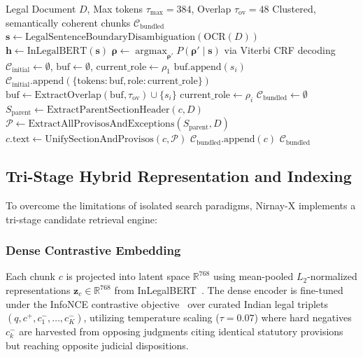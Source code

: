 \documentclass[conference]{IEEEtran}
\begin{document}
\begin{algorithm}[!t]
\caption{Proviso-Aware Rhetorical Chunking and Bundling}
\label{alg:chunking}
\begin{algorithmic}[1]
\Require Legal Document $D$, Max tokens $\tau_{\max}=384$, Overlap $\tau_{\text{ov}}=48$
\Ensure Clustered, semantically coherent chunks $\mathcal{C}_{\text{bundled}}$
\State $\mathbf{s} \gets \text{LegalSentenceBoundaryDisambiguation}(\text{OCR}(D))$
\State $\mathbf{h} \gets \text{InLegalBERT}(\mathbf{s})$
\State $\mathbf{\rho} \gets \operatorname{argmax}_{\mathbf{\rho}'} P(\mathbf{\rho}' \mid \mathbf{s})$ via Viterbi CRF decoding~\cite{lafferty2001crf}
\State $\mathcal{C}_{\text{initial}} \gets \emptyset$, $\text{buf} \gets \emptyset$, $\text{current\_role} \gets \rho_1$
        \State $\text{buf}.\text{append}(s_i)$
    \Else
        \State $\mathcal{C}_{\text{initial}}.\text{append}(\{\text{tokens}: \text{buf}, \text{role}: \text{current\_role}\})$
        \State $\text{buf} \gets \text{ExtractOverlap}(\text{buf}, \tau_{\text{ov}}) \cup \{s_i\}$
        \State $\text{current\_role} \gets \rho_i$
    \EndIf
\EndFor
\State $\mathcal{C}_{\text{bundled}} \gets \emptyset$
        \State $S_{\text{parent}} \gets \text{ExtractParentSectionHeader}(c, D)$
        \State $\mathcal{P} \gets \text{ExtractAllProvisosAndExceptions}(S_{\text{parent}}, D)$
        \State $c.\text{text} \gets \text{UnifySectionAndProvisos}(c, \mathcal{P})$
    \EndIf
    \State $\mathcal{C}_{\text{bundled}}.\text{append}(c)$
\EndFor
\State \Return $\mathcal{C}_{\text{bundled}}$
\end{algorithmic}
\end{algorithm}

\subsection{Tri-Stage Hybrid Representation and Indexing}
To overcome the limitations of isolated search paradigms, Nirnay-X implements a tri-stage candidate retrieval engine:

\subsubsection{Dense Contrastive Embedding}
Each chunk $c$ is projected into latent space $\mathbb{R}^{768}$ using mean-pooled $L_2$-normalized representations $\mathbf{z}_c \in \mathbb{R}^{768}$ from InLegalBERT~\cite{paul2022pre}. The dense encoder is fine-tuned under the InfoNCE contrastive objective~\cite{oord2018infonce} over curated Indian legal triplets $(q, c^+, c^-_1, \dots, c^-_K)$, utilizing temperature scaling ($\tau = 0.07$) where hard negatives $c^-_k$ are harvested from opposing judgments citing identical statutory provisions but reaching opposite judicial dispositions.
\end{document}
